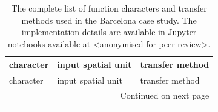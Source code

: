 \begin{longtable}{p{5cm}p{3cm}p{5cm}}
\caption{The complete list of function characters and transfer methods used in the Barcelona case study. The implementation details are available
in Jupyter notebooks available at <anonymised for peer-review>.}
\label{tab:fn_bcn} \\
\toprule
                                         character & input spatial unit &                                    transfer method \\
\midrule
\endfirsthead

\toprule
                                         character & input spatial unit &                                    transfer method \\
\midrule
\endhead
\midrule
\multicolumn{3}{r}{{Continued on next page}} \\
\midrule
\endfoot


\end{longtable}
